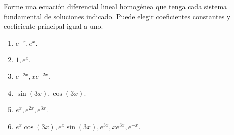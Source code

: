 Forme una ecuación diferencial lineal homogénea que tenga cada sistema fundamental de soluciones indicado. Puede elegir coeficientes constantes y coeficiente principal igual a uno.

\begin{enumerate}[label=(\alph*),ref=\alph*,leftmargin=*]
\item $e^{-x},e^x$.
\item $1,e^x$.
\item $e^{-2x},xe^{-2x}$.
\item $\sin(3x),\cos(3x)$.
\item $e^x,e^{2x},e^{3x}$.
\item $e^x\cos(3x),e^x\sin(3x),e^{3x},xe^{3x},e^{-x}$.
\end{enumerate}
